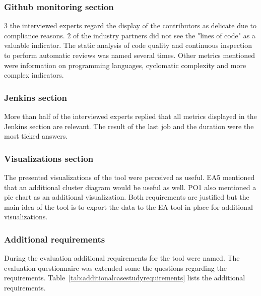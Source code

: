 \subsubsection{Github monitoring section}

3 the interviewed experts regard the display of the contributors as delicate due to compliance reasons. 2 of the industry partners did not see the "lines of code" as a valuable indicator. The static analysis of code quality and continuous inspection to perform automatic reviews was named several times. Other metrics mentioned were information on programming languages, cyclomatic complexity and more complex indicators.

\subsubsection{Jenkins section}

More than half of the interviewed experts replied that all metrics displayed in the Jenkins section are relevant. The result of the last job and the duration were the most ticked answers.

\subsubsection{Visualizations section}
The presented visualizations of the tool were perceived as useful. EA5 mentioned that an additional cluster diagram would be useful as well. PO1 also mentioned a pie chart as an additional visualization. Both requirements are justified but the main idea of the tool is to export the data to the EA tool in place for additional visualizations. 

\subsubsection{Additional requirements}\label{subsubsection:additionalrequirementsazd}
During the evaluation additional requirements for the tool were named. The evaluation questionnaire was extended some the questions regarding the requirements. Table~\ref{tab:additionalcasestudyrequirements} lists the additional requirements.

